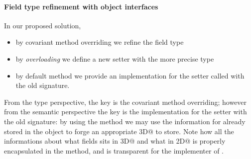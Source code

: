 \paragraph{Field type refinement with object interfaces}
In our proposed solution,
\begin{itemize}
\item by covariant method overriding we refine the field type
\item by \emph{overloading} we define a new setter with the more precise type
\item by default method we provide an implementation for the setter called with the old signature.
\end{itemize}





From the type perspective, the key is the covariant method overriding; however from the semantic perspective the key is the implementation for the setter with the old signature:
by using the \Q@with@ method we may use the information for \Q@z@ already stored in the object to forge an appropriate \Q@Point3D@ to store.
Note how all the informations about what fields sits in \Q@Point3D@ and what in \Q@Point2D@ is properly encapsulated in the \Q@with@ method, and is transparent for the implementer of \Q@Bird@.

